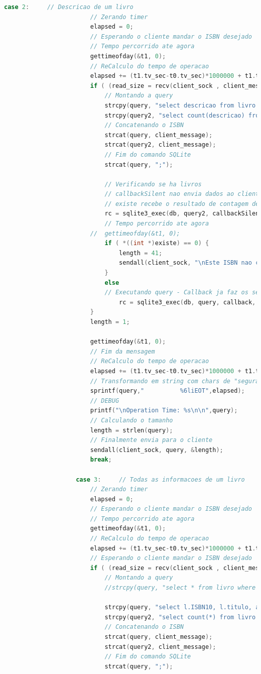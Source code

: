 \documentclass[10pt,a4paper]{report}
\begin{document}
\begin{lstlisting}[language=C,label=callback]
					case 2:		// Descricao de um livro
						// Zerando timer
						elapsed = 0;
						// Esperando o cliente mandar o ISBN desejado
						// Tempo percorrido ate agora
						gettimeofday(&t1, 0);
						// ReCalculo do tempo de operacao
						elapsed += (t1.tv_sec-t0.tv_sec)*1000000 + t1.tv_usec-t0.tv_usec;
						if ( (read_size = recv(client_sock , client_message , 2000 , 0)) > 0 ) {
							// Montando a query
							strcpy(query, "select descricao from livro where ISBN10 = ");
							strcpy(query2, "select count(descricao) from livro where ISBN10 = ");
							// Concatenando o ISBN
							strcat(query, client_message);
							strcat(query2, client_message);
							// Fim do comando SQLite
							strcat(query, ";");

							// Verificando se ha livros
							// callbackSilent nao envia dados ao cliente
							// existe recebe o resultado de contagem de livros (0 ou 1)
							rc = sqlite3_exec(db, query2, callbackSilent, existe, &zErrMsg);
							// Tempo percorrido ate agora
						//	gettimeofday(&t1, 0);
							if ( *((int *)existe) == 0) {
								length = 41;
								sendall(client_sock, "\nEste ISBN nao consta na nossa livraria!\n",&length);
							}
							else
							// Executando query - Callback ja faz os sends
								rc = sqlite3_exec(db, query, callback, 0, &zErrMsg);
						}
						length = 1;

						gettimeofday(&t1, 0);
						// Fim da mensagem
						// ReCalculo do tempo de operacao
						elapsed += (t1.tv_sec-t0.tv_sec)*1000000 + t1.tv_usec-t0.tv_usec;
						// Transformando em string com chars de "seguranca" para postumo atoi
						sprintf(query,"          %6liEOT",elapsed);
						// DEBUG
						printf("\nOperation Time: %s\n\n",query);
						// Calculando o tamanho
						length = strlen(query);
						// Finalmente envia para o cliente
						sendall(client_sock, query, &length);
						break;

					case 3:		// Todas as informacoes de um livro
						// Zerando timer
						elapsed = 0;
						// Esperando o cliente mandar o ISBN desejado
						// Tempo percorrido ate agora
						gettimeofday(&t1, 0);
						// ReCalculo do tempo de operacao
						elapsed += (t1.tv_sec-t0.tv_sec)*1000000 + t1.tv_usec-t0.tv_usec;
						// Esperando o cliente mandar o ISBN desejado
						if ( (read_size = recv(client_sock , client_message , 2000 , 0)) > 0 ) {
							// Montando a query
							//strcpy(query, "select * from livro where ISBN10 = ");

							strcpy(query, "select l.ISBN10, l.titulo, a.autor, a.autor2, a.autor3, a.autor4, l.descricao, l.editora, l.ano, l.estoque from livro l, autor a where l.autores=a.a_id and ISBN10 = ");
							strcpy(query2, "select count(*) from livro where ISBN10 = ");
							// Concatenando o ISBN
							strcat(query, client_message);
							strcat(query2, client_message);
							// Fim do comando SQLite
							strcat(query, ";");


\end{lstlisting}
\end{document}
